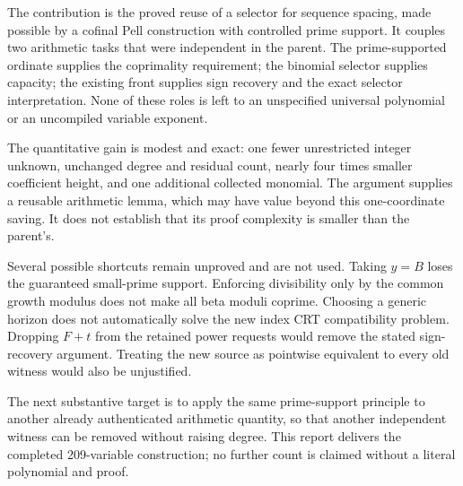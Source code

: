 \documentclass[11pt]{article}
\theoremstyle{definition}
\theoremstyle{remark}
\begin{document}
The contribution is the proved reuse of a selector for sequence spacing,
made possible by a cofinal Pell construction with controlled prime support.
It couples two arithmetic tasks that were independent in the parent.
The prime-supported ordinate supplies the coprimality requirement; the
binomial selector supplies capacity; the existing front supplies sign
recovery and the exact selector interpretation. None of these roles is
left to an unspecified universal polynomial or an uncompiled variable
exponent.

The quantitative gain is modest and exact: one fewer unrestricted
integer unknown, unchanged degree and residual count, nearly four times
smaller coefficient height, and one additional collected monomial. The
argument supplies a reusable arithmetic lemma, which may have value beyond
this one-coordinate saving. It does not establish that its proof complexity
is smaller than the parent's.

Several possible shortcuts remain unproved and are not used. Taking
$y=B$ loses the guaranteed small-prime support. Enforcing divisibility
only by the common growth modulus does not make all beta moduli coprime.
Choosing a generic horizon does not automatically solve the new index CRT
compatibility problem. Dropping $F+t$ from the retained power requests
would remove the stated sign-recovery argument. Treating the new source
as pointwise equivalent to every old witness would also be unjustified.

The next substantive target is to apply the same prime-support principle
to another already authenticated arithmetic quantity, so that another
independent witness can be removed without raising degree. This report
delivers the completed 209-variable construction; no further count is
claimed without a literal polynomial and proof.
\end{document}
